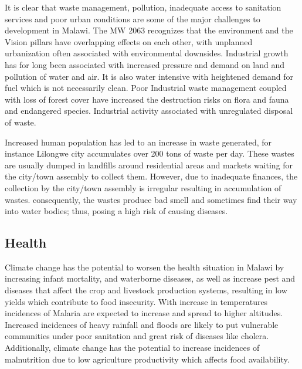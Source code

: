 \documentclass[
]{book}
\begin{document}
It is clear that waste management, pollution, inadequate access to sanitation services and poor urban conditions are some of the major challenges to development in Malawi. The MW 2063 recognizes that the environment and the Vision pillars have overlapping effects on each other, with unplanned urbanization often associated with environmental downsides. Industrial growth has for long been associated with increased pressure and demand on land and pollution of water and air. It is also water intensive with heightened demand for fuel which is not necessarily clean. Poor Industrial waste management coupled with loss of forest cover have increased the destruction risks on flora and fauna and endangered species. Industrial activity associated with unregulated disposal of waste.

Increased human population has led to an increase in waste generated, for instance Lilongwe city accumulates over 200 tons of waste per day. These wastes are usually dumped in landfills around residential areas and markets waiting for the city/town assembly to collect them. However, due to inadequate finances, the collection by the city/town assembly is irregular resulting in accumulation of wastes. consequently, the wastes produce bad smell and sometimes find their way into water bodies; thus, posing a high risk of causing diseases.

\hypertarget{health}{%
\subsection{Health}\label{health}}

Climate change has the potential to worsen the health situation in Malawi by increasing infant mortality, and waterborne diseases, as well as increase pest and diseases that affect the crop and livestock production systems, resulting in low yields which contribute to food insecurity. With increase in temperatures incidences of Malaria are expected to increase and spread to higher altitudes. Increased incidences of heavy rainfall and floods are likely to put vulnerable communities under poor sanitation and great risk of diseases like cholera. Additionally, climate change has the potential to increase incidences of malnutrition due to low agriculture productivity which affects food availability.
\end{document}
